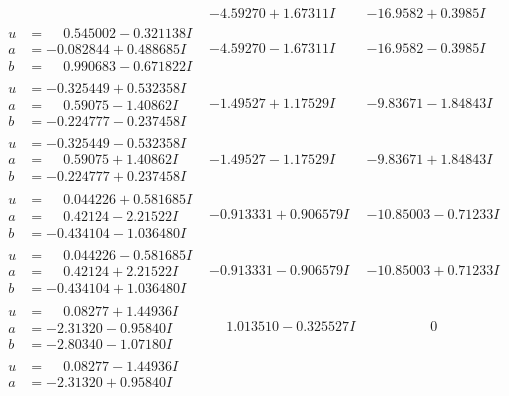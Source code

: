\documentclass[1p]{elsarticle_modified}
\theoremstyle{definition}
\begin{document}
$$\begin{array}{c|c|c}
 & -4.59270 + 1.67311 I & -16.9582 + 0.3985 I \\ \hline\begin{aligned}
u &= \phantom{-}0.545002 - 0.321138 I \\
a &= -0.082844 + 0.488685 I \\
b &= \phantom{-}0.990683 - 0.671822 I\end{aligned}
 & -4.59270 - 1.67311 I & -16.9582 - 0.3985 I \\ \hline\begin{aligned}
u &= -0.325449 + 0.532358 I \\
a &= \phantom{-}0.59075 - 1.40862 I \\
b &= -0.224777 - 0.237458 I\end{aligned}
 & -1.49527 + 1.17529 I & -9.83671 - 1.84843 I \\ \hline\begin{aligned}
u &= -0.325449 - 0.532358 I \\
a &= \phantom{-}0.59075 + 1.40862 I \\
b &= -0.224777 + 0.237458 I\end{aligned}
 & -1.49527 - 1.17529 I & -9.83671 + 1.84843 I \\ \hline\begin{aligned}
u &= \phantom{-}0.044226 + 0.581685 I \\
a &= \phantom{-}0.42124 - 2.21522 I \\
b &= -0.434104 - 1.036480 I\end{aligned}
 & -0.913331 + 0.906579 I & -10.85003 - 0.71233 I \\ \hline\begin{aligned}
u &= \phantom{-}0.044226 - 0.581685 I \\
a &= \phantom{-}0.42124 + 2.21522 I \\
b &= -0.434104 + 1.036480 I\end{aligned}
 & -0.913331 - 0.906579 I & -10.85003 + 0.71233 I \\ \hline\begin{aligned}
u &= \phantom{-}0.08277 + 1.44936 I \\
a &= -2.31320 - 0.95840 I \\
b &= -2.80340 - 1.07180 I\end{aligned}
 & \phantom{-}1.013510 - 0.325527 I & \phantom{-0.000000 } 0 \\ \hline\begin{aligned}
u &= \phantom{-}0.08277 - 1.44936 I \\
a &= -2.31320 + 0.95840 I \\

\end{aligned}
\end{array}$$
\end{document}
